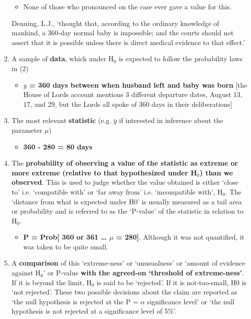 \documentclass[]{book}
\providecommand{\tightlist}{%
  \setlength{\itemsep}{0pt}\setlength{\parskip}{0pt}}
\begin{document}
\begin{enumerate}
  \begin{itemize}
  \tightlist
  \item
    None of those who pronounced on the case ever gave a value for this.
  \end{itemize}

  Denning, L.J., `thought that, according to the ordinary knowledge of mankind, a 360-day normal baby is
  impossible; and the courts should not assert that it is possible unless there is direct medical evidence to that effect.'
\item
  A sample of \textbf{data}, which under H\(_0\) is expected to follow the probability laws in (2)

  \begin{itemize}
  \tightlist
  \item
    \textbf{\(y\) = 360 days between when husband left and baby was born} {[}the House of Lords account mentions 3 different departure dates, August 13, 17, and 29, but the Lords all spoke of 360 days in their deliberations{]}
  \end{itemize}
\item
  The most relevant \textbf{statistic} (e.g. \(\bar{y}\) if interested in inference about the parameter \(\mu\))

  \begin{itemize}
  \tightlist
  \item
    \textbf{360 - 280 = 80 days}
  \end{itemize}
\item
  The \textbf{probability of observing a value of the statistic as extreme or more extreme (relative to that hypothesized under H\(_0\)) than we observed}. This is used to judge whether the value obtained is either `close to' i.e. `compatible with' or `far away from' i.e. `incompatible with', H\(_0\). The `distance from what is expected under H0' is usually measured as a tail area or probability and is referred to as the `P-value' of the statistic in relation to H\(_0\).

  \begin{itemize}
  \tightlist
  \item
    \textbf{P = Prob{[} 360 or 361 \ldots{} \textbar{} \(\mu\) = 280{]}}. Although it was not quantified, it was taken to be quite small.
  \end{itemize}
\item
  A \textbf{comparison} of this `extreme-ness' or `unusualness' or `amount of evidence against H\(_0\)' or P-value \textbf{with the agreed-on `threshold of extreme-ness'}. If it is beyond the limit, H\(_0\) is said to be `rejected'. If it is not-too-small, H0 is `not rejected'. These two possible decisions about the claim are reported as `the null hypothesis is rejected at the P = \(\alpha\) significance level' or `the null hypothesis is not rejected at a significance level of 5\%'.


\end{enumerate}
\end{document}
